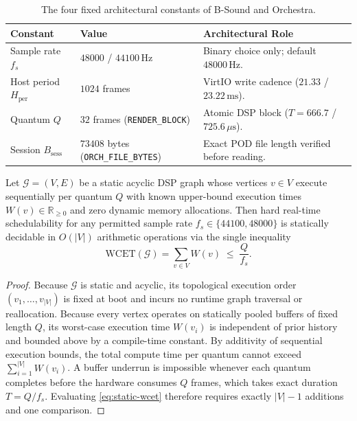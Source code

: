 \begin{table}[htbp]
\centering
\caption{The four fixed architectural constants of B-Sound and Orchestra.}
\label{tab:four-constants}
\small
\begin{tabularx}{\textwidth}{@{}llX@{}}
\toprule
Constant & Value & Architectural Role \\
\midrule
Sample rate $f_s$ & $48000$ / $44100\,\text{Hz}$ & Binary choice only; default $48000\,\text{Hz}$. \\
Host period $H_{\mathrm{per}}$ & $1024$ frames & VirtIO write cadence ($21.33$ / $23.22\,\text{ms}$). \\
Quantum $Q$ & $32$ frames (\texttt{RENDER\_BLOCK}) & Atomic DSP block ($T = 666.7$ / $725.6\,\mu\text{s}$). \\
Session $B_{\mathrm{sess}}$ & $73408$ bytes (\texttt{ORCH\_FILE\_BYTES}) & Exact POD file length verified before reading. \\
\bottomrule
\end{tabularx}
\end{table}

\begin{theorem}
\label{thm:rt-decidable}
Let $\mathcal{G} = (V, E)$ be a static acyclic DSP graph whose vertices $v \in V$ execute sequentially per quantum $Q$ with known upper-bound execution times $W(v) \in \mathbb{R}_{\ge 0}$ and zero dynamic memory allocations. Then hard real-time schedulability for any permitted sample rate $f_s \in \{44100, 48000\}$ is statically decidable in $O(|V|)$ arithmetic operations via the single inequality
\begin{equation}
\label{eq:static-wcet}
\mathrm{WCET}(\mathcal{G}) = \sum_{v \in V} W(v) \;\le\; \frac{Q}{f_s}.
\end{equation}
\end{theorem}

\begin{proof}
Because $\mathcal{G}$ is static and acyclic, its topological execution order $(v_1, \dots, v_{|V|})$ is fixed at boot and incurs no runtime graph traversal or reallocation. Because every vertex operates on statically pooled buffers of fixed length $Q$, its worst-case execution time $W(v_i)$ is independent of prior history and bounded above by a compile-time constant. By additivity of sequential execution bounds, the total compute time per quantum cannot exceed $\sum_{i=1}^{|V|} W(v_i)$. A buffer underrun is impossible whenever each quantum completes before the hardware consumes $Q$ frames, which takes exact duration $T = Q/f_s$. Evaluating \eqref{eq:static-wcet} therefore requires exactly $|V|-1$ additions and one comparison.
\end{proof}

